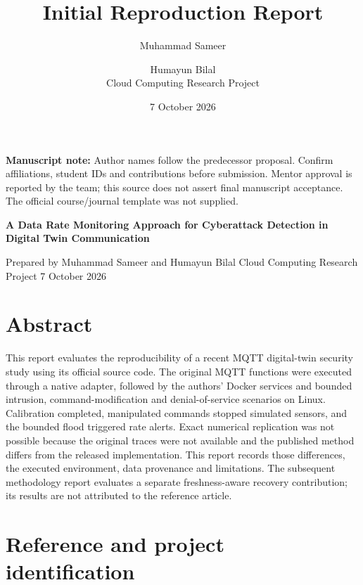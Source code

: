 \documentclass[11pt,a4paper]{article}
\title{Initial Reproduction Report}
\author{Muhammad Sameer \and Humayun Bilal\\\small Cloud Computing Research Project}
\date{7 October 2026}
\begin{document}
\maketitle
\noindent\textbf{Manuscript note:} Author names follow the predecessor proposal. Confirm affiliations, student IDs and contributions before submission. Mentor approval is reported by the team; this source does not assert final manuscript acceptance. The official course/journal template was not supplied.

\textbf{A Data Rate Monitoring Approach for Cyberattack Detection in Digital Twin Communication}


Prepared by Muhammad Sameer and Humayun Bilal  Cloud Computing Research Project  7 October 2026


\section{Abstract}

This report evaluates the reproducibility of a recent MQTT digital-twin security study using its official source code. The original MQTT functions were executed through a native adapter, followed by the authors' Docker services and bounded intrusion, command-modification and denial-of-service scenarios on Linux. Calibration completed, manipulated commands stopped simulated sensors, and the bounded flood triggered rate alerts. Exact numerical replication was not possible because the original traces were not available and the published method differs from the released implementation. This report records those differences, the executed environment, data provenance and limitations. The subsequent methodology report evaluates a separate freshness-aware recovery contribution; its results are not attributed to the reference article.


\section{Reference and project identification}
\end{document}

